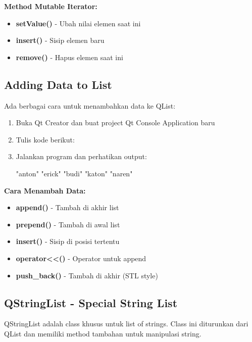 \textbf{Method Mutable Iterator:}
\begin{itemize}
\item \textbf{setValue()} - Ubah nilai elemen saat ini
\item \textbf{insert()} - Sisip elemen baru
\item \textbf{remove()} - Hapus elemen saat ini
\end{itemize}

\subsection{Adding Data to List}

Ada berbagai cara untuk menambahkan data ke QList:

\begin{enumerate}
\item Buka Qt Creator dan buat project Qt Console Application baru
\item Tulis kode berikut:



\item Jalankan program dan perhatikan output:

\begin{lcverbatim}
"anton"
"erick"
"budi"
"katon"
"naren"
\end{lcverbatim}
\end{enumerate}

\textbf{Cara Menambah Data:}
\begin{itemize}
\item \textbf{append()} - Tambah di akhir list
\item \textbf{prepend()} - Tambah di awal list
\item \textbf{insert()} - Sisip di posisi tertentu
\item \textbf{operator<<()} - Operator untuk append
\item \textbf{push_back()} - Tambah di akhir (STL style)
\end{itemize}

\subsection{QStringList - Special String List}

QStringList adalah class khusus untuk list of strings. Class ini diturunkan dari QList dan memiliki method tambahan untuk manipulasi string.


